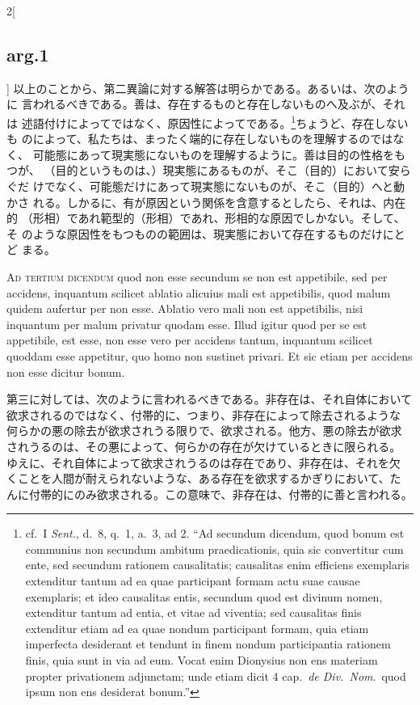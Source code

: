 \documentclass[paper=a4paper,fontsize=10pt,jafontsize=9pt,titlepage]{jlreq}
\begin{document}
\begin{paracol}{2}[\subsection{arg.1}]
以上のことから、第二異論に対する解答は明らかである。あるいは、次のように
 言われるべきである。善は、存在するものと存在しないものへ及ぶが、それは
 述語付けによってではなく、原因性によってである。\footnote{cf.~I
 {\itshape Sent.}, d.~8, q.~1, a.~3, ad 2. ``Ad secundum dicendum, quod
 bonum est communius non secundum ambitum praedicationis, quia sic
 convertitur cum ente, sed secundum rationem causalitatis; causalitas
 enim efficiens exemplaris extenditur tantum ad ea quae participant
 formam actu suae causae exemplaris; et ideo causalitas entis, secundum
 quod est divinum nomen, extenditur tantum ad entia, et vitae ad
 viventia; sed causalitas finis extenditur etiam ad ea quae nondum
 participant formam, quia etiam imperfecta desiderant et tendunt in
 finem nondum participantia rationem finis, quia sunt in via ad
 eum. Vocat enim Dionysius non ens materiam propter privationem
 adjunctam; unde etiam dicit 4 cap.~{\itshape de Div.~Nom}.~quod ipsum non ens
 desiderat bonum.''}ちょうど、存在しないも
 のによって、私たちは、まったく端的に存在しないものを理解するのではなく、
 可能態にあって現実態にないものを理解するように。善は目的の性格をもつが、
 （目的というものは、）現実態にあるものが、そこ（目的）において安らぐだ
 けでなく、可能態だけにあって現実態にないものが、そこ（目的）へと動かさ
 れる。しかるに、有が原因という関係を含意するとしたら、それは、内在的
 （形相）であれ範型的（形相）であれ、形相的な原因でしかない。そして、そ
 のような原因性をもつものの範囲は、現実態において存在するものだけにとど
 まる。

\switchcolumn*[\subsection{ad.3}]

{\scshape Ad tertium dicendum} quod non esse secundum se non est
 appetibile, sed per accidens, inquantum scilicet ablatio alicuius mali
 est appetibilis, quod malum quidem aufertur per non esse. Ablatio vero
 mali non est appetibilis, nisi inquantum per malum privatur quodam
 esse. Illud igitur quod per se est appetibile, est esse, non esse vero
 per accidens tantum, inquantum scilicet quoddam esse appetitur, quo
 homo non sustinet privari. Et sic etiam per accidens non esse dicitur
 bonum.

\switchcolumn

第三に対しては、次のように言われるべきである。非存在は、それ自体において
 欲求されるのではなく、付帯的に、つまり、非存在によって除去されるような
 何らかの悪の除去が欲求されうる限りで、欲求される。他方、悪の除去が欲求
 されうるのは、その悪によって、何らかの存在が欠けているときに限られる。
 ゆえに、それ自体によって欲求されうるのは存在であり、非存在は、それを欠
 くことを人間が耐えられないような、ある存在を欲求するかぎりにおいて、た
 んに付帯的にのみ欲求される。この意味で、非存在は、付帯的に善と言われる。


\end{paracol}
\end{document}
